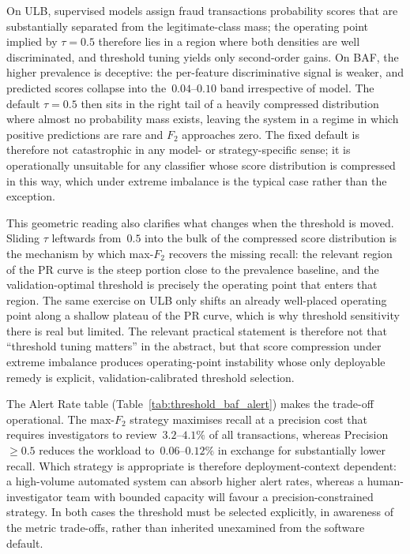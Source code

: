 \documentclass[a4paper,fleqn]{cas-sc}
\begin{document}
On ULB, supervised models assign fraud transactions probability scores that are
substantially separated from the legitimate-class mass; the operating point implied by
$\tau=0.5$ therefore lies in a region where both densities are well discriminated, and
threshold tuning yields only second-order gains. On BAF, the higher prevalence is
deceptive: the per-feature discriminative signal is weaker, and predicted scores
collapse into the~$0.04$--$0.10$ band irrespective of model. The default $\tau=0.5$ then
sits in the right tail of a heavily compressed distribution where almost no probability
mass exists, leaving the system in a regime in which positive predictions are rare and
$F_2$ approaches zero. The fixed default is therefore not catastrophic in any model-
or strategy-specific sense; it is operationally unsuitable for any classifier whose
score distribution is compressed in this way, which under extreme imbalance is the
typical case rather than the exception.

This geometric reading also clarifies what changes when the threshold is moved. Sliding
$\tau$ leftwards from~$0.5$ into the bulk of the compressed score distribution is the
mechanism by which max-$F_2$ recovers the missing recall: the relevant region of the PR
curve is the steep portion close to the prevalence baseline, and the validation-optimal
threshold is precisely the operating point that enters that region. The same exercise
on ULB only shifts an already well-placed operating point along a shallow plateau of
the PR curve, which is why threshold sensitivity there is real but limited. The
relevant practical statement is therefore not that ``threshold tuning matters'' in the
abstract, but that score compression under extreme imbalance produces operating-point
instability whose only deployable remedy is explicit, validation-calibrated threshold
selection.

The Alert Rate table (Table~\ref{tab:threshold_baf_alert}) makes the trade-off
operational. The max-$F_2$ strategy maximises recall at a precision cost that requires
investigators to review~$3.2$--$4.1\%$ of all transactions, whereas Precision~$\geq\!0.5$
reduces the workload to~$0.06$--$0.12\%$ in exchange for substantially lower recall.
Which strategy is appropriate is therefore deployment-context dependent: a high-volume
automated system can absorb higher alert rates, whereas a human-investigator team with
bounded capacity will favour a precision-constrained strategy. In both cases the
threshold must be selected explicitly, in awareness of the metric trade-offs, rather
than inherited unexamined from the software default.
\end{document}
